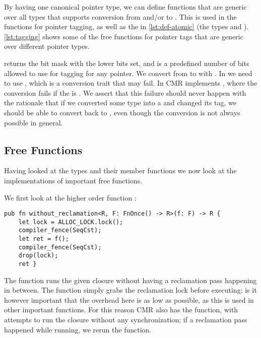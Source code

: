 By having one canonical pointer type, we can define functions that are generic over all types
that supports conversion from and/or to . This is used in the functions for
pointer tagging, as well as the  in \cref{lst:def-atomic} (the types  and
). \cref{lst:tagging} shows some of the free functions for pointer tags that are generic
over different pointer types.

\begin{figure}[ht]

\end{figure}

 returns the bit mask with the  lower bits set, and  is a
predefined number of bits allowed to use for tagging for any pointer. We convert from  to
 with  .  In   we need
to use , which is a conversion trait that may fail. In CMR  implements
, where the conversion fails if the  is . We
assert that this failure should never happen  with the rationale that if we converted
some type  into a  and changed its tag, we should be able to convert back
to , even though the conversion is not always possible in general.

\subsection{Free Functions}

Having looked at the types and their member functions we now look at the implementations of
important free functions.

We first look at the higher order function :
\begin{lstlisting}[style=Rust]
pub fn without_reclamation<R, F: FnOnce() -> R>(f: F) -> R {
    let lock = ALLOC_LOCK.lock();
    compiler_fence(SeqCst);
    let ret = f();
    compiler_fence(SeqCst);
    drop(lock);
    ret }
\end{lstlisting}
The function runs the given closure without having a reclamation pass happening in between.  The
function simply grabs the reclamation lock before executing; is it however important that the
overhead here is as low as possible, as this is used in other important functions. For this reason
CMR also has the  function, with attempts to run the closure
without any synchronization; if a reclamation pass happened while running, we rerun the function.


